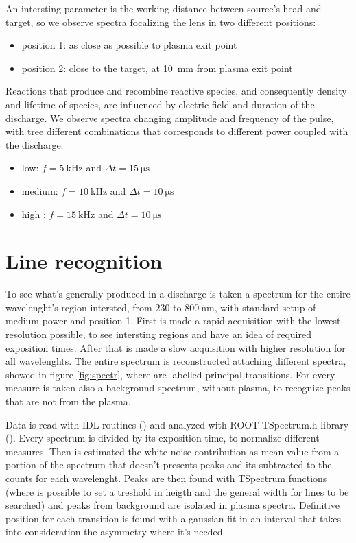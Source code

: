An intersting parameter is the working distance between source's head and target, so we observe spectra focalizing the lens in two different positions:
\begin{itemize}
 \item position 1: as close as possible to plasma exit point
 \item position 2: close to the target, at \SI{10}{\milli\meter} from plasma exit point
\end{itemize}

Reactions that produce and recombine reactive species, and consequently density and lifetime of species, are influenced by electric field and duration of the discharge. We observe spectra changing amplitude and frequency of the pulse, with tree different combinations that corresponds to different power coupled with the discharge:
\begin{itemize}
 \item low: $f = \SI{5}{\kilo\hertz}$ and $\Delta t = \SI{15}{\micro\second}$
 \item medium: $f = \SI{10}{\kilo\hertz}$ and $\Delta t = \SI{10}{\micro\second}$
 \item high : $f = \SI{15}{\kilo\hertz}$ and $\Delta t = \SI{10}{\micro\second}$
\end{itemize}


\section{Line recognition}
To see what's generally produced in a discharge is taken a spectrum for the entire wavelenght's region intersted, from $\num{230}$ to $\SI{800}{\nano\meter}$, with standard setup of medium power and position 1.
First is made a rapid acquisition with the lowest resolution possible, to see intersting regions and have an idea of required exposition times. After that is made a slow acquisition with higher resolution for all wavelenghts. The entire spectrum is reconstructed attaching different spectra, showed in figure \ref{fig:spectr}, where are labelled principal transitions.
For every measure is taken also a background spectrum, without plasma, to recognize peaks that are not from the plasma.

Data is read with IDL routines (\cite{}) and analyzed with ROOT TSpectrum.h library (\cite{}). Every spectrum is divided by its exposition time, to normalize different measures. Then is estimated the white noise contribution as mean value from a portion of the spectrum that doesn't presents peaks and its subtracted to the counts for each wavelenght. Peaks are then found with TSpectrum functions (where is possible to set a treshold in heigth and the general width for lines to be searched) and peaks from background are isolated in plasma spectra. Definitive position for each transition is found with a gaussian fit in an interval that takes into consideration the asymmetry where it's needed.

